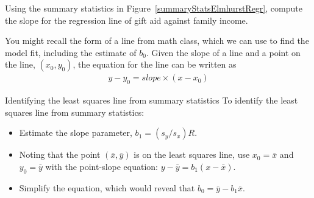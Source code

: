 \D{\newpage}

\begin{exercisewrap}
\begin{nexercise} \label{findingTheSlopeOfTheLSRLineForIncomeAndAid}
Using the summary statistics in Figure~\ref{summaryStatsElmhurstRegr}, compute the slope for the regression line of gift aid against family income.\footnotemark
\end{nexercise}
\end{exercisewrap}

You might recall the  form of a line
from math class, which we can use to find the model fit,
including the estimate of $b_0$.
Given the slope of a line and a point on the line,
$(x_0, y_0)$, the equation for the line can be written as
\begin{align*}
y - y_0 = slope\times (x - x_0)
\end{align*}

\begin{onebox}{Identifying the least squares line from summary statistics}
To identify the least squares line from summary statistics:\vspace{-1mm}
\begin{itemize}
\setlength{\itemsep}{0mm}
\item
    Estimate the slope parameter, $b_1 = (s_y / s_x) R$.
\item
    Noting that the point $(\bar{x}, \bar{y})$ is on the least
    squares line, use $x_0 = \bar{x}$ and $y_0 = \bar{y}$ with
    the point-slope equation: $y - \bar{y} = b_1 (x - \bar{x})$.
\item
    Simplify the equation, which would reveal that
    $b_0 = \bar{y} - b_1 \bar{x}$.
\end{itemize}
\end{onebox}

